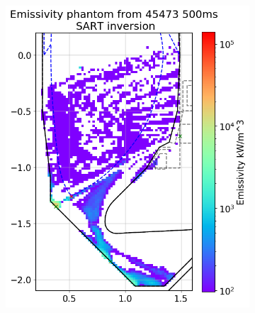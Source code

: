 \begin{figure}
\begin{subfigure}{0.49\linewidth}
         \includegraphics[trim={10 5 0 45},clip,width=\textwidth]{Chapters/chapter2/figs/inversion_comparison_emissivity_SOLPS_pantom_test-SART.png}
         \caption{}
         \label{fig:SOLPS_phantom2e}
     \end{subfigure}
     \hfill
     \begin{subfigure}{0.49\linewidth}
         \centering

\end{subfigure}
\end{figure}
